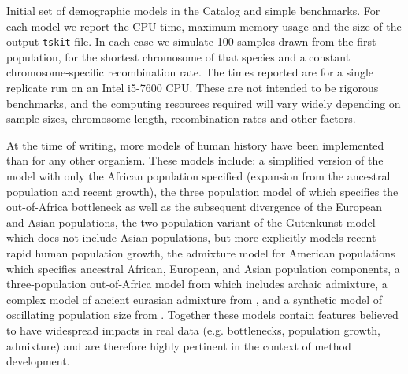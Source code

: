\documentclass[12pt,halfline,a4paper]{ouparticle}
\newcommand{\tskit}{\texttt{tskit}\xspace}
\begin{document}
\renewcommand{\arraystretch}{1.2}
\begin{table}[t]
\makebox[\textwidth][c]{
    \begin{footnotesize}
    
    \end{footnotesize}
}
\caption{\label{tab:catalog}
Initial set of demographic models in the Catalog and simple benchmarks.
For each model we report the CPU time, maximum memory usage and the
size of the output \tskit file. In each case we simulate 100 samples
drawn from the first population, for the shortest chromosome of that species
and a constant chromosome-specific recombination rate.
The times reported are for a single replicate run on an Intel i5-7600 CPU.
These are not intended to be rigorous benchmarks, and the computing resources
required will vary widely depending on sample sizes, chromosome length,
recombination rates and other factors.
}
\end{table}

At the time of writing, more models of human history have been implemented than for
any other organism. These models include: a simplified version of the \cite{tennessen2012evolution}
model with only the African population specified (expansion from the ancestral
population and recent growth), the three population model of \cite{gutenkunst2009inferring}
which specifies the out-of-Africa bottleneck as well as the subsequent divergence of
the European and Asian populations, the \cite{tennessen2012evolution} two population variant of the
Gutenkunst model which does not include Asian populations, but more explicitly models
recent rapid human population growth, the \cite{browning2018ancestry} admixture model
for American populations which specifies ancestral African, European, and Asian population
components, a three-population out-of-Africa model from \cite{ragsdale2019models}
which includes archaic admixture, a complex model of ancient eurasian admixture from \cite{kamm2019efficiently},
and a synthetic model of oscillating population size from \cite{schiffels2014inferring}.
Together these models
contain features believed to have widespread impacts in real data (e.g. bottlenecks, population growth,
admixture) and are therefore highly pertinent in the context of method development.
\end{document}
